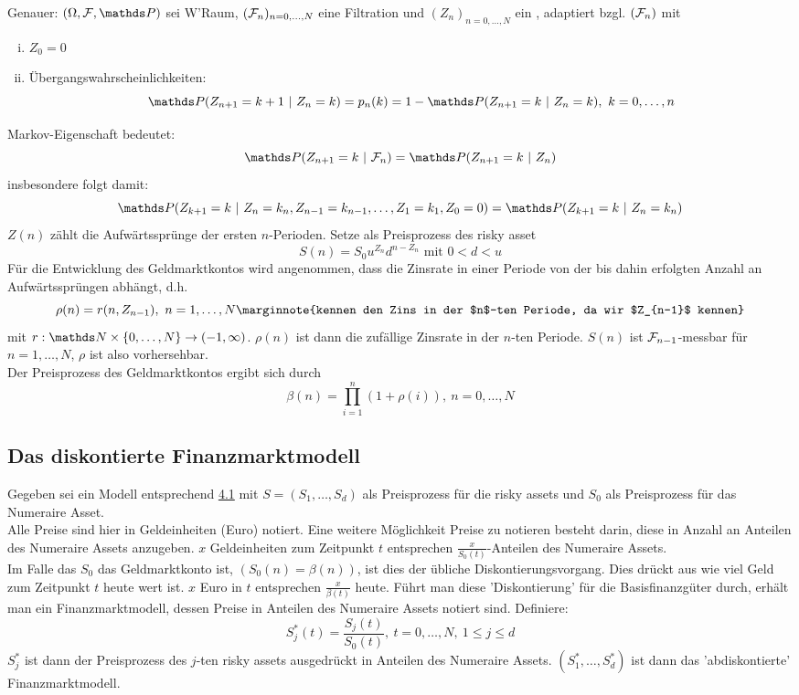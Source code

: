 \begin{enumerate}[(a)]
	Genauer: $(\Omega,\F,\Pw)$ sei W'Raum, $(\mathcal{F}_n)_{n=0,\dots,N}$ eine Filtration und $(Z_n)_{n=0,\dots,N}$ ein , adaptiert bzgl. $(\mathcal{F}_n)$ mit
	\begin{enumerate}[(i)]
		\item $Z_0=0$
		\item Übergangswahrscheinlichkeiten:
		\[
		\Pw(Z_{n+1}=k+1~|~Z_n=k)=p_n(k)=1-\Pw(Z_{n+1}=k~|~Z_n=k),~ k=0,\dots,n
		\]
	\end{enumerate}
	Markov-Eigenschaft bedeutet:
	\[
	\Pw(Z_{n+1}=k~|~\F_n)=\Pw(Z_{n+1}=k~|~Z_n)
	\]
	insbesondere folgt damit:
	\[
	\Pw(Z_{k+1}=k~|~Z_n=k_n,Z_{n-1}=k_{n-1},\dots,Z_1=k_1,Z_0=0)=\Pw(Z_{k+1}=k~|~Z_n=k_n)
	\]
	$Z(n)$ zählt die Aufwärtssprünge der ersten $n$-Perioden. Setze als Preisprozess des risky asset
	\[
	S(n)=S_0u^{Z_n}d^{n-Z_n}\text{ mit }0<d<u
	\]
	Für die Entwicklung des Geldmarktkontos wird angenommen, dass die Zinsrate in einer Periode von der bis dahin erfolgten Anzahl an Aufwärtssprüngen abhängt, d.h.
	\[
	\rho(n)=r(n,Z_{n-1}),~n=1,\dots,N \marginnote{kennen den Zins in der $n$-ten Periode, da wir $Z_{n-1}$ kennen}
	\]
	mit $r:\N\times \{0,\dots,N\}\to (-1,\infty)$. 
	$\rho(n)$ ist dann die zufällige Zinsrate in der $n$-ten Periode. 
	$S(n)$ ist $\mathcal{F}_{n-1}$-messbar für $n=1,\dots,N$, $\rho$ ist also vorhersehbar.\\
	Der Preisprozess des Geldmarktkontos ergibt sich durch
	\[
	\beta(n)=\prod_{i=1}^{n}(1+\rho(i)),~n=0,\dots,N
	\]
\end{enumerate}

\subsection{Das diskontierte Finanzmarktmodell}
\label{sub:disk_finanzmarktmodell}
Gegeben sei ein Modell entsprechend \hyperref[sub:beschreibung_fimarkt]{4.1} mit $S=(S_1,\dots,S_d)$ als Preisprozess für die risky assets und $S_0$ als Preisprozess für das Numeraire Asset.\\
Alle Preise sind hier in Geldeinheiten (Euro) notiert. 
Eine weitere Möglichkeit Preise zu notieren besteht darin, diese in Anzahl an Anteilen des Numeraire Assets anzugeben. 
$x$ Geldeinheiten zum Zeitpunkt $t$ entsprechen $\frac{x}{S_0(t)}$-Anteilen des Numeraire Assets.\\
Im Falle das $S_0$ das Geldmarktkonto ist, $(S_0(n)=\beta(n))$, ist dies der übliche Diskontierungsvorgang. 
Dies drückt aus wie viel Geld zum Zeitpunkt $t$ heute wert ist. 
$x$ Euro in $t$ entsprechen $\frac{x}{\beta(t)}$ heute. 
Führt man diese 'Diskontierung' für die Basisfinanzgüter durch, erhält man ein Finanzmarktmodell, dessen Preise in Anteilen des Numeraire Assets notiert sind.
Definiere:
\[
S_j^*(t)=\frac{S_j(t)}{S_0(t)},~t=0,\dots,N,~1\le j \le d
\]
$S_j^*$ ist dann der Preisprozess des $j$-ten risky assets ausgedrückt in Anteilen des Numeraire Assets.
$(S_1^*,\dots,S_d^*)$ ist dann das 'abdiskontierte' Finanzmarktmodell.

